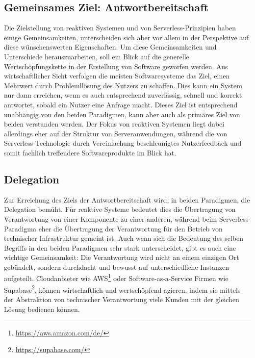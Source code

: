 \subsection{Gemeinsames Ziel: Antwortbereitschaft}
Die Zielstellung von reaktiven Systemen und von Serverless-Prinzipien haben einige Gemeinsamkeiten, unterscheiden sich aber vor allem in der Perspektive auf diese wünschenswerten Eigenschaften. Um diese Gemeinsamkeiten und Unterschiede herauszuarbeiten, soll ein Blick auf die generelle Wertschöpfungskette in der Erstellung von Software geworfen werden. Aus wirtschaftlicher Sicht verfolgen die meisten Softwaresysteme das Ziel, einen Mehrwert durch Problemllösung des Nutzers zu schaffen. Dies kann ein System nur dann erreichen, wenn es auch entsprechend zuverlässig, schnell und korrekt antwortet, sobald ein Nutzer eine Anfrage macht. Dieses Ziel ist entsprechend unabhängig von den beiden Paradigmen, kann aber auch als primäres Ziel von beiden verstanden werden. Der Fokus von reaktiven Systemen liegt dabei allerdings eher auf der Struktur von Serveranwendungen, während die von Serverless-Technologie durch Vereinfachung beschleunigtes Nutzerfeedback und somit fachlich treffendere Softwareprodukte im Blick hat.
\subsection{Delegation}
Zur Erreichung des Ziels der Antwortbereitschaft wird, in beiden Paradigmen, die Delegation bemüht. Für reaktive Systeme bedeutet dies die Übertragung von Verantwortung von einer Komponente zu einer anderen, während beim Serverless-Paradigma eher die Übertragung der Verantwortung für den Betrieb von technischer Infrastruktur gemeint ist. Auch wenn sich die Bedeutung des selben Begriffs in den beiden Paradigmen sehr stark unterscheidet, gibt es auch eine wichtige Gemeinsamkeit: Die Verantwortung wird nicht an einem einzigen Ort gebündelt, sondern durchdacht und bewusst auf unterschiedliche Instanzen aufgeteilt. Cloudanbieter wie AWS\footnote{\url{https://aws.amazon.com/de/}} oder Software-as-a-Service Firmen wie Supabase\footnote{\url{https://supabase.com/}}, können wirtschaftlich und wertschöpfend agieren, indem sie mittels der Abstraktion von technischer Verantwortung viele Kunden mit der gleichen Lösung bedienen können.

